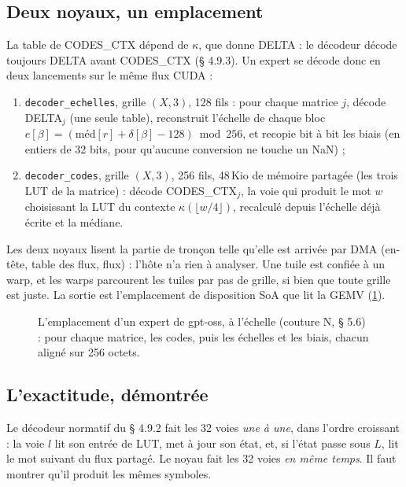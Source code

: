 \subsection{Deux noyaux, un emplacement}

La table de CODES\_CTX dépend de $\kappa$, que donne DELTA : le décodeur décode toujours DELTA avant CODES\_CTX (§ 4.9.3). Un expert se décode donc en deux lancements sur le même flux CUDA :
\begin{enumerate}
\item \texttt{decoder\_echelles}, grille $(X, 3)$, 128 fils : pour chaque matrice $j$, décode DELTA$_j$ (une seule table), reconstruit l'échelle de chaque bloc $e[\beta] = (\text{méd}[r] + \delta[\beta] - 128) \bmod 256$, et recopie bit à bit les biais (en entiers de 32 bits, pour qu'aucune conversion ne touche un NaN) ;
\item \texttt{decoder\_codes}, grille $(X, 3)$, 256 fils, 48\,Kio de mémoire partagée (les trois LUT de la matrice) : décode CODES\_CTX$_j$, la voie qui produit le mot $w$ choisissant la LUT du contexte $\kappa(\lfloor w/4 \rfloor)$, recalculé depuis l'échelle déjà écrite et la médiane.
\end{enumerate}
Les deux noyaux lisent la partie de tronçon telle qu'elle est arrivée par DMA (en-tête, table des flux, flux) : l'hôte n'a rien à analyser. Une tuile est confiée à un warp, et les warps parcourent les tuiles par pas de grille, si bien que toute grille est juste. La sortie est l'emplacement de disposition SoA que lit la GEMV (\cref{fig:t2n-soa}).

\begin{figure}[!htbp]
\centering
\SchemaNoySoA
\caption[L'emplacement SoA d'un expert de gpt-oss, à l'échelle]{L'emplacement d'un expert de gpt-oss, à l'échelle (couture N, § 5.6) : pour chaque matrice, les codes, puis les échelles et les biais, chacun aligné sur 256 octets.}
\label{fig:t2n-soa}
\end{figure}

\subsection{L'exactitude, démontrée}

Le décodeur normatif du § 4.9.2 fait les 32 voies \emph{une à une}, dans l'ordre croissant : la voie $l$ lit son entrée de LUT, met à jour son état, et, si l'état passe sous $L$, lit le mot suivant du flux partagé. Le noyau fait les 32 voies \emph{en même temps}. Il faut montrer qu'il produit les mêmes symboles.

